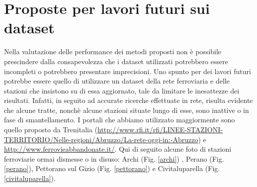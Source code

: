 \section{Proposte per lavori futuri sui dataset}
Nella valutazione delle performance dei metodi proposti non è possibile prescindere dalla consapevolezza che i dataset utilizzati potrebbero essere incompleti o potrebbero presentare imprecisioni. 
Uno spunto per dei lavori futuri potrebbe essere quello di utilizzare un dataset della rete ferroviaria e delle stazioni che insistono su di essa aggiornato, tale da limitare le inesattezze dei risultati. Infatti, in seguito ad accurate ricerche effettuate in rete, risulta evidente che alcune tratte, nonchè alcune stazioni situate lungo di esse, sono inattive o in fase di smantellamento. I portali che abbiamo utilizzato maggiormente sono quello proposto da Trenitalia (\url{http://www.rfi.it/rfi/LINEE-STAZIONI-TERRITORIO/Nelle-regioni/Abruzzo/La-rete-oggi-in:-Abruzzo}) e \url{http://www.ferrovieabbandonate.it/}.
\newpage
Qui di seguito alcune foto di stazioni ferroviarie ormai dismesse o in disuso: Archi (Fig. \ref{archi}) , Perano (Fig. \ref{perano}), Pettorano sul Gizio (Fig. \ref{pettorano}) e Civitaluparella (Fig. \ref{civitaluparella}).
